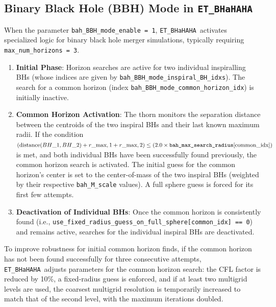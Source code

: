 \documentclass[a4paper,11pt]{article}
\newcommand{\thorn}[1]{{\tt #1}}
\newcommand{\BHaHAHA}{\thorn{ET\_BHaHAHA}} %
\begin{document}
\subsection{Binary Black Hole (BBH) Mode in \BHaHAHA}
\label{ssec:physics_bbh_mode}
When the parameter \texttt{bah\_BBH\_mode\_enable = 1}, \BHaHAHA\ activates specialized logic for binary black hole merger simulations, typically requiring \texttt{max\_num\_horizons = 3}.
\begin{enumerate}
    \item \textbf{Initial Phase}: Horizon searches are active for two individual inspiralling BHs (whose indices are given by \texttt{bah\_BBH\_mode\_inspiral\_BH\_idxs}). The search for a common horizon (index \texttt{bah\_BBH\_mode\_common\_horizon\_idx}) is initially inactive.
    \item \textbf{Common Horizon Activation}: The thorn monitors the separation distance between the centroids of the two inspiral BHs and their last known maximum radii. If the condition $(\text{distance}(BH\_1, BH\_2) + r\_{\text{max},1} + r\_{\text{max},2}) \le (2.0 \times \text{\texttt{bah\_max\_search\_radius}}[\text{common\_idx}])$ is met, and both individual BHs have been successfully found previously, the common horizon search is activated. The initial guess for the common horizon's center is set to the center-of-mass of the two inspiral BHs (weighted by their respective \texttt{bah\_M\_scale} values). A full sphere guess is forced for its first few attempts.
    \item \textbf{Deactivation of Individual BHs}: Once the common horizon is consistently found (i.e., \texttt{use\_fixed\_radius\_guess\_on\_full\_sphere[common\_idx] == 0}) and remains active, searches for the individual inspiral BHs are deactivated.
\end{enumerate}
To improve robustness for initial common horizon finds, if the common horizon has not been found successfully for three consecutive attempts, \BHaHAHA\ adjusts parameters for the common horizon search: the CFL factor is reduced by 10\%, a fixed-radius guess is enforced, and if at least two multigrid levels are used, the coarsest multigrid resolution is temporarily increased to match that of the second level, with the maximum iterations doubled.
\end{document}
